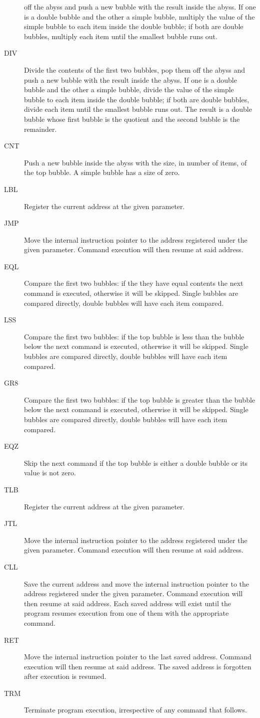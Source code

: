 \documentclass[11pt,a4paper,draft]{book}
\begin{document}
\begin{description}
  off the abyss and push a new bubble with the result inside the
  abyss. If one is a double bubble and the other a simple bubble,
  multiply the value of the simple bubble to each item inside the
  double bubble; if both are double bubbles, multiply each item until
  the smallest bubble runs out.
\item[DIV] Divide the contents of the first two bubbles, pop them off
  the abyss and push a new bubble with the result inside the abyss. If
  one is a double bubble and the other a simple bubble, divide the
  value of the simple bubble to each item inside the double bubble; if
  both are double bubbles, divide each item until the smallest bubble
  runs out. The result is a double bubble whose first bubble is the
  quotient and the second bubble is the remainder.
\item[CNT] Push a new bubble inside the abyss with the size, in number
  of items, of the top bubble. A simple bubble has a size of zero.
\item[LBL] Register the current address at the given parameter.
\item[JMP] Move the internal instruction pointer to the address
  registered under the given parameter. Command execution will then
  resume at said address.
\item[EQL] Compare the first two bubbles: if the they have equal
  contents the next command is executed, otherwise it will be
  skipped. Single bubbles are compared directly, double bubbles will
  have each item compared.
\item[LSS] Compare the first two bubbles: if the top bubble is less
  than the bubble below the next command is executed, otherwise it
  will be skipped. Single bubbles are compared directly, double
  bubbles will have each item compared.
\item[GR8] Compare the first two bubbles: if the top bubble is greater
  than the bubble below the next command is executed, otherwise it
  will be skipped. Single bubbles are compared directly, double
  bubbles will have each item compared.
\item[EQZ] Skip the next command if the top bubble is either a double
  bubble or its value is not zero.
\item[TLB] Register the current address at the given parameter.
\item[JTL] Move the internal instruction pointer to the address
  registered under the given parameter. Command execution will then
  resume at said address.
\item[CLL] Save the current address and move the internal instruction
  pointer to the address registered under the given parameter. Command
  execution will then resume at said address. Each saved address will
  exist until the program resumes execution from one of them with the
  appropriate command.
\item[RET] Move the internal instruction pointer to the last saved
  address. Command execution will then resume at said address. The
  saved address is forgotten after execution is resumed.
\item[TRM] Terminate program execution, irrespective of any command
  that follows.
\end{description}
\end{document}
